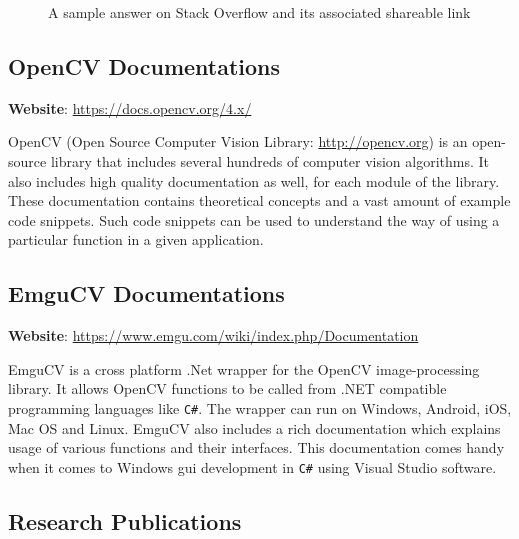 \documentclass[a4paper,12pt]{report}
\begin{document}
\begin{figure}[h]
	\centering
	\caption{A sample answer on Stack Overflow and its associated shareable link}
	\label{fig:stackof}
\end{figure}

\subsection{OpenCV Documentations}

\textbf{Website}: \url{https://docs.opencv.org/4.x/}

OpenCV (Open Source Computer Vision Library: \url{http://opencv.org}) is an open-source library that includes several hundreds of computer vision algorithms. It also includes high quality documentation as well, for each module of the library. These documentation contains theoretical concepts and a vast amount of example code snippets. Such code snippets can be used to understand the way of using a particular function in a given application. 

\subsection{EmguCV Documentations}
\label{EmguCV Documentations}

\textbf{Website}: \url{https://www.emgu.com/wiki/index.php/Documentation}

EmguCV is a  cross platform .Net wrapper for the OpenCV image-processing library. It allows OpenCV functions to be called from .NET compatible programming languages like {\tt C\#}. The wrapper can run on Windows, Android, iOS, Mac OS and Linux. EmguCV also includes a rich documentation which explains usage of various functions and their interfaces. This documentation comes handy when it comes to Windows \ac{gui} development in {\tt C\#} using Visual Studio software.

\subsection{Research Publications}
\end{document}
